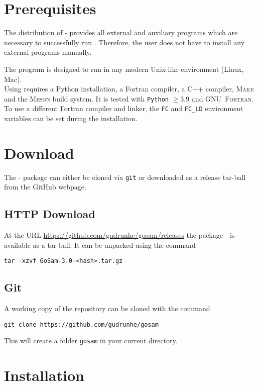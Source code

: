\section{Prerequisites}

The distribution of \gosam-\gosamversion{} provides all external and auxiliary programs which are necessary 
to successfully run \gosam. 
Therefore, the user does not have to install any external programs manually.

The program \gosam is designed to run in any modern Unix-like environment (Linux, Mac).\\
Using \gosam requires a Python installation, a Fortran compiler, a C++ compiler, \textsc{Make} and the \textsc{Meson} build system. It is tested with \texttt{Python} $\geq 3.9$ and \textsc{GNU~Fortran}.
To use a different Fortran compiler and linker, the \texttt{FC} and \texttt{FC\_LD} environment variables can
be set during the installation.


\section{Download}

The \gosam-\gosamversion{} package can either be cloned 
via \texttt{git}
or downloaded as a release tar-ball from the GitHub webpage.

\subsection*{HTTP Download}
At the URL \url{https://github.com/gudrunhe/gosam/releases} the package
\gosam-\gosamversion{} is available as a tar-ball. 
It can be unpacked using the command
\begin{lstlisting}[style=sh]
tar -xzvf GoSam-3.0-<hash>.tar.gz
\end{lstlisting}

\subsection*{Git}
A working copy of the repository can be cloned with the command
\begin{lstlisting}[style=sh]
git clone https://github.com/gudrunhe/gosam
\end{lstlisting}
This will create a folder \texttt{gosam} in your current directory.

\section{Installation}

